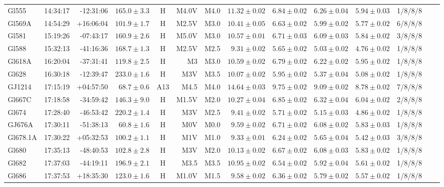 \documentclass[referee]{aa}
\begin{document}
\begin{table}[h!]
{\begin{tabular}{ l r r r c r r r r r r r r r}
Gl555 & 14:34:17 & -12:31:06 & $165.0 \pm  3.3$ & H & M4.0V & M4.0 &  $11.32 \pm 0.02$ & $6.84 \pm 0.02$ & $6.26 \pm 0.04$ & $5.94 \pm 0.03$ & 1/8/8/8 \\
Gl569A & 14:54:29 & +16:06:04 & $101.9 \pm  1.7$ & H & M2.5V & M3.0 &  $10.41 \pm 0.05$ & $6.63 \pm 0.02$ & $5.99 \pm 0.02$ & $5.77 \pm 0.02$ & 6/8/8/8 \\
Gl581 & 15:19:26 & -07:43:17 & $160.9 \pm  2.6$ & H & M5.0V & M3.0 &  $10.57 \pm 0.01$ & $6.71 \pm 0.03$ & $6.09 \pm 0.03$ & $5.84 \pm 0.02$ & 3/8/8/8 \\
Gl588 & 15:32:13 & -41:16:36 & $168.7 \pm  1.3$ & H & M2.5V & M2.5 &  $9.31 \pm 0.02$ & $5.65 \pm 0.02$ & $5.03 \pm 0.02$ & $4.76 \pm 0.02$ & 1/8/8/8 \\
Gl618A & 16:20:04 & -37:31:41 & $119.8 \pm  2.5$ & H & M3 & M3.0 &  $10.59 \pm 0.02$ & $6.79 \pm 0.02$ & $6.22 \pm 0.02$ & $5.95 \pm 0.02$ & 1/8/8/8 \\
Gl628 & 16:30:18 & -12:39:47 & $233.0 \pm  1.6$ & H & M3V & M3.5 &  $10.07 \pm 0.02$ & $5.95 \pm 0.02$ & $5.37 \pm 0.04$ & $5.08 \pm 0.02$ & 1/8/8/8 \\
GJ1214 & 17:15:19 & +04:57:50 & $68.7 \pm  0.6$ & A13 & M4.5 & M4.0 &  $14.64 \pm 0.03$ & $9.75 \pm 0.02$ & $9.09 \pm 0.02$ & $8.78 \pm 0.02$ & 7/8/8/8 \\
Gl667C & 17:18:58 & -34:59:42 & $146.3 \pm  9.0$ & H & M1.5V & M2.0 &  $10.27 \pm 0.04$ & $6.85 \pm 0.02$ & $6.32 \pm 0.04$ & $6.04 \pm 0.02$ & 2/8/8/8 \\
Gl674 & 17:28:40 & -46:53:42 & $220.2 \pm  1.4$ & H & M3V & M2.5 &  $9.41 \pm 0.02$ & $5.71 \pm 0.02$ & $5.15 \pm 0.03$ & $4.86 \pm 0.02$ & 1/8/8/8 \\
GJ676A & 17:30:11 & -51:38:13 & $60.8 \pm  1.6$ & H & M0V & M0.0 &  $9.59 \pm 0.02$ & $6.71 \pm 0.02$ & $6.08 \pm 0.02$ & $5.83 \pm 0.03$ & 1/8/8/8 \\
Gl678.1A & 17:30:22 & +05:32:53 & $100.2 \pm  1.1$ & H & M1V & M1.0 &  $9.33 \pm 0.01$ & $6.24 \pm 0.02$ & $5.65 \pm 0.04$ & $5.42 \pm 0.03$ & 3/8/8/8 \\
Gl680 & 17:35:13 & -48:40:53 & $102.8 \pm  2.8$ & H & M3V & M2.0 &  $10.13 \pm 0.02$ & $6.67 \pm 0.02$ & $6.08 \pm 0.03$ & $5.83 \pm 0.02$ & 1/8/8/8 \\
Gl682 & 17:37:03 & -44:19:11 & $196.9 \pm  2.1$ & H & M3.5 & M3.5 &  $10.95 \pm 0.02$ & $6.54 \pm 0.02$ & $5.92 \pm 0.04$ & $5.61 \pm 0.02$ & 1/8/8/8 \\
Gl686 & 17:37:53 & +18:35:30 & $123.0 \pm  1.6$ & H & M1.0V & M1.5 &  $9.58 \pm 0.02$ & $6.36 \pm 0.02$ & $5.79 \pm 0.02$ & $5.57 \pm 0.02$ & 1/8/8/8 \\

\end{tabular}}
\end{table}
\end{document}

